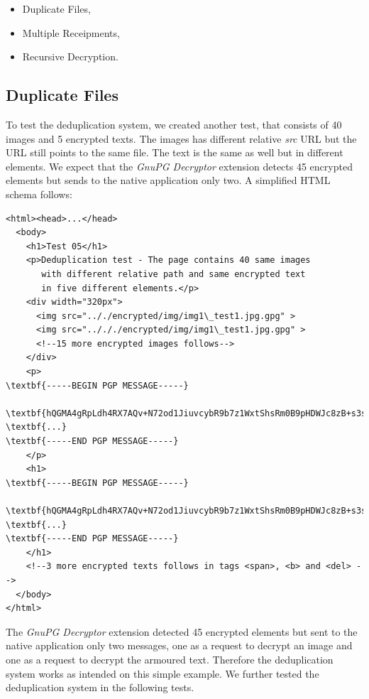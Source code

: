 \begin{itemize}
    \item Duplicate Files,
    \item Multiple Receipments,
    \item Recursive Decryption.
\end{itemize}

\subsection{Duplicate Files}
\label{test:duplicities}

To test the deduplication system, we created another test, that consists of 40 images and 5 encrypted texts. The images has different relative \textit{src} URL but the URL still points to the same file. The text is the same as well but in different elements. We expect that the \textit{GnuPG Decryptor} extension detects 45 encrypted elements but sends to the native application only two. A simplified HTML schema follows:

\begin{Verbatim}[commandchars=\\\{\},codes={\catcode`$=3\catcode`_=8},samepage=false,frame=single]
<html><head>...</head>
  <body>
    <h1>Test 05</h1>
    <p>Deduplication test - The page contains 40 same images
       with different relative path and same encrypted text
       in five different elements.</p>
    <div width="320px">
      <img src=".././encrypted/img/img1\_test1.jpg.gpg" >
      <img src="../././encrypted/img/img1\_test1.jpg.gpg" >
      <!--15 more encrypted images follows-->
    </div>
    <p>
\textbf{-----BEGIN PGP MESSAGE-----}

\textbf{hQGMA4gRpLdh4RX7AQv+N72od1JiuvcybR9b7z1WxtShsRm0B9pHDWJc8zB+s3sk}
\textbf{...}
\textbf{-----END PGP MESSAGE-----}
    </p>
    <h1>
\textbf{-----BEGIN PGP MESSAGE-----}

\textbf{hQGMA4gRpLdh4RX7AQv+N72od1JiuvcybR9b7z1WxtShsRm0B9pHDWJc8zB+s3sk}
\textbf{...}
\textbf{-----END PGP MESSAGE-----}
    </h1>
    <!--3 more encrypted texts follows in tags <span>, <b> and <del> -->
  </body>
</html>
\end{Verbatim}

The \textit{GnuPG Decryptor} extension detected 45 encrypted elements but sent to the native application only two messages, one as a request to decrypt an image and one as a request to decrypt the armoured text. Therefore the deduplication system works as intended on this simple example. We further tested the deduplication system in the following tests.

